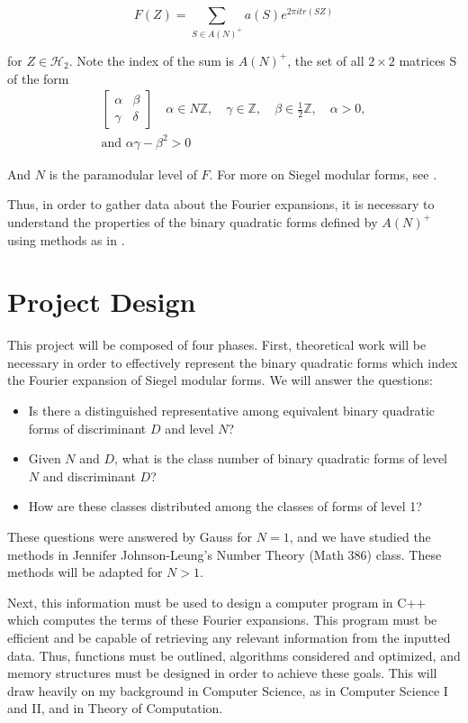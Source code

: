 \documentclass[11pt, oneside]{amsart}
\begin{document}
$$F(Z) = \sum_{S\in A(N)^+}a(S)e^{2\pi itr(SZ)}$$

for $Z\in \mathcal{H}_2$. Note the index of the sum is $A(N)^+$, the set of all $2\times 2$ matrices S of the form
\begin{gather*}
\begin{bmatrix}
\alpha &	\beta \\
\gamma & \delta
\end{bmatrix}
\quad \alpha \in N\mathbb{Z} ,\quad  \gamma \in \mathbb{Z} ,\quad \beta \in \frac{1}{2} \mathbb{Z} ,\quad \alpha > 0, \\
\text{and } \alpha \gamma - \beta ^2 > 0
\end{gather*}

And $N$ is the paramodular level of $F$. For more on Siegel modular forms, see \cite{Van Der Geer}.

Thus, in order to gather data about the Fourier expansions, it is necessary to understand the properties of the binary quadratic forms defined by $A(N)^+$ using methods as in \cite{Buell}.

\section{Project Design}

This project will be composed of four phases. First, theoretical work will be necessary in order to effectively represent the binary quadratic forms which index the Fourier expansion of Siegel modular forms. We will answer the questions:
\begin{itemize}
	\item Is there a distinguished representative among equivalent binary quadratic forms of discriminant $D$ and level $N$?
	\item Given $N$ and $D$,  what is the class number of binary quadratic forms of level $N$ and discriminant $D$? 
	\item How are these classes distributed among the classes of forms of level 1?
\end{itemize}These questions were answered by Gauss for $N=1$, and we have studied the methods in Jennifer Johnson-Leung's Number Theory (Math 386) class. These methods will be adapted for $N>1$.

Next, this information must be used to design a computer program in C++ which computes the terms of these Fourier expansions. This program must be efficient and be capable of retrieving any relevant information from the inputted data. Thus, functions must be outlined, algorithms considered and optimized, and memory structures must be designed in order to achieve these goals. This will draw heavily on my background in Computer Science, as in Computer Science I and II, and in Theory of Computation.
\end{document}
